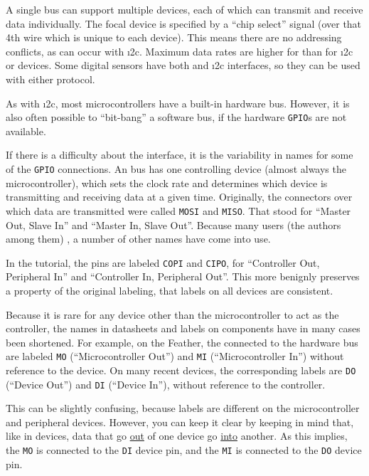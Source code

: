 A single \spi bus can support multiple devices, each of which can transmit and receive data individually.
The focal device is specified by a ``chip select'' signal (over that 4th wire which is unique to each device).
This means there are no addressing conflicts, as can occur with \i2c.
Maximum data rates are higher for \spi than for \i2c or \uart devices.
Some digital sensors have both \spi and \i2c interfaces, so they can be used with either protocol.

As with \i2c, most microcontrollers have a built-in hardware \spi bus.
However, it is also often possible to ``bit-bang'' a software \spi bus, if the hardware \texttt{GPIO}s are not available.

	\begin{kaobox}[frametitle=Name that pin!]
		If there is a difficulty about the \spi interface, it is the variability in names for some of the \texttt{GPIO} connections.
		An \spi bus has one controlling device (almost always the  microcontroller), which sets the clock rate and determines which device is transmitting and receiving data at a given time.
		Originally, the connectors over which data are transmitted were called \texttt{MOSI} and \texttt{MISO}.
		That stood for ``Master Out, Slave In'' and ``Master In, Slave Out''.
		Because many users (the authors among them) , a number of other names have come into use.

		In the  tutorial, the pins are labeled \texttt{COPI} and \texttt{CIPO}, for ``Controller Out, Peripheral In'' and ``Controller In, Peripheral Out''.
		This more benignly preserves a property of the original labeling, that labels on all devices are consistent.

		Because it is rare for any device other than the microcontroller to act as the controller, the names in datasheets and labels on components have in many cases been shortened.
		For example, on the  Feather, the \gpios connected to the hardware \spi bus are labeled \texttt{MO} (``Microcontroller Out'') and \texttt{MI} (``Microcontroller In'') without reference to the device.
		On many recent \spi devices, the corresponding labels are \texttt{DO} (``Device Out'') and \texttt{DI} (``Device In''), without reference to the controller.

		This can be slightly confusing, because labels are different on the microcontroller and peripheral devices.
	  However, you can keep it clear by keeping in mind that, like in \uart devices, data that go \underline{out} of one device go \underline{into} another.
	  As this implies, the \texttt{MO} \gpio is connected to the \texttt{DI} device pin, and the \texttt{MI} \gpio is connected to the \texttt{DO} device pin.
	\end{kaobox}


